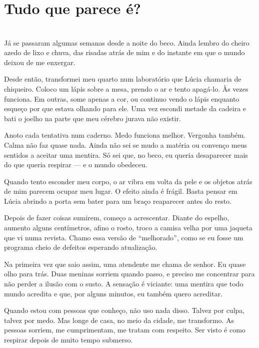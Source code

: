\newpage

\ifdefined\useChapters
\chapter{Tudo que parece é?}
\else
\chapter{}
\fi

Já se passaram algumas semanas desde a noite do beco. Ainda lembro do cheiro azedo de lixo e chuva, das risadas atrás de mim e do instante em que o mundo deixou de me enxergar.

Desde então, transformei meu quarto num laboratório que Lúcia chamaria de chiqueiro. Coloco um lápis sobre a mesa, prendo o ar e tento apagá-lo. Às vezes funciona. Em outras, some apenas a cor, ou continuo vendo o lápis enquanto esqueço por que estava olhando para ele. Uma vez escondi metade da cadeira e bati o joelho na parte que meu cérebro jurava não existir.

Anoto cada tentativa num caderno. Medo funciona melhor. Vergonha também. Calma não faz quase nada. Ainda não sei se mudo a matéria ou convenço meus sentidos a aceitar uma mentira. Só sei que, no beco, eu queria desaparecer mais do que queria respirar — e o mundo obedeceu.

\medskip

Quando tento esconder meu corpo, o ar vibra em volta da pele e os objetos atrás de mim parecem ocupar meu lugar. O efeito ainda é frágil. Basta pensar em Lúcia abrindo a porta sem bater para um braço reaparecer antes do resto.

\medskip

Depois de fazer coisas sumirem, começo a acrescentar. Diante do espelho, aumento alguns centímetros, afino o rosto, troco a camisa velha por uma jaqueta que vi numa revista. Chamo essa versão de “melhorado”, como se eu fosse um programa cheio de defeitos esperando atualização.

Na primeira vez que saio assim, uma atendente me chama de senhor. Eu quase olho para trás. Duas meninas sorriem quando passo, e preciso me concentrar para não perder a ilusão com o susto. A sensação é viciante: uma mentira que todo mundo acredita e que, por alguns minutos, eu também quero acreditar.

Quando estou com pessoas que conheço, não uso nada disso.  
Talvez por culpa, talvez por medo.  
Mas longe de casa, no meio da cidade, me transformo.  
As pessoas sorriem, me cumprimentam, me tratam com respeito.  
Ser visto é como respirar depois de muito tempo submerso.

